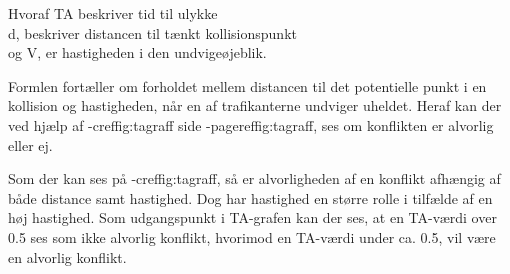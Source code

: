 
Hvoraf TA beskriver tid til ulykke \\ d, beskriver distancen til tænkt kollisionspunkt \\ og V, er hastigheden i den undvigeøjeblik.

Formlen fortæller om forholdet mellem distancen til det potentielle punkt i en kollision og hastigheden, når en af trafikanterne undviger uheldet. Heraf kan der ved hjælp af -cref{fig:tagraff} side -pageref{fig:tagraff}, ses om konflikten er alvorlig eller ej.



Som der kan ses på -cref{fig:tagraff}, så er alvorligheden af en konflikt afhængig af både distance samt hastighed. Dog har hastighed en større rolle i tilfælde af en høj hastighed.
Som udgangspunkt i TA-grafen kan der ses, at en TA-værdi over 0.5 ses som ikke alvorlig konflikt, hvorimod en TA-værdi under ca. 0.5, vil være en alvorlig konflikt.



